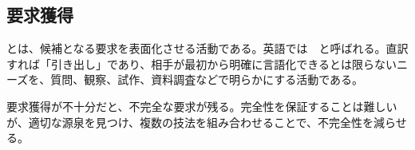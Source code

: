 \subsection{要求獲得}

とは、候補となる要求を表面化させる活動である。英語では \,\, と呼ばれる。直訳すれば「引き出し」であり、相手が最初から明確に言語化できるとは限らないニーズを、質問、観察、試作、資料調査などで明らかにする活動である。

要求獲得が不十分だと、不完全な要求が残る。完全性を保証することは難しいが、適切な源泉を見つけ、複数の技法を組み合わせることで、不完全性を減らせる。
